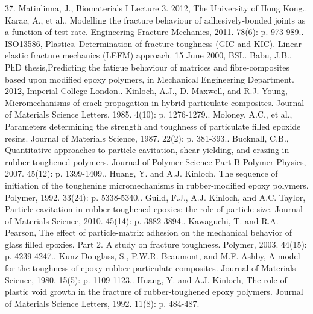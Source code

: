 \documentclass[numbers=noendperiod,chapterprefix=on]{icldt} %
\begin{document}
37.	Matinlinna, J., Biomaterials I Lecture 3. 2012, The University of Hong Kong..	Karac, A., et al., Modelling the fracture behaviour of adhesively-bonded joints as a function of test rate. Engineering Fracture Mechanics, 2011. 78(6): p. 973-989..	ISO13586, Plastics. Determination of fracture toughness (GIC and KIC). Linear elastic fracture mechanics (LEFM) approach. 15 June 2000, BSI..	Babu, J.B., PhD thesis,Predicting the fatigue behaviour of matrices and fibre-composites based upon modified epoxy polymers, in Mechanical Engineering Department. 2012, Imperial College London..	Kinloch, A.J., D. Maxwell, and R.J. Young, Micromechanisms of crack-propagation in hybrid-particulate composites. Journal of Materials Science Letters, 1985. 4(10): p. 1276-1279..	Moloney, A.C., et al., Parameters determining the strength and toughness of particulate filled epoxide resins. Journal of Materials Science, 1987. 22(2): p. 381-393..	Bucknall, C.B., Quantitative approaches to particle cavitation, shear yielding, and crazing in rubber-toughened polymers. Journal of Polymer Science Part B-Polymer Physics, 2007. 45(12): p. 1399-1409..	Huang, Y. and A.J. Kinloch, The sequence of initiation of the toughening micromechanisms in rubber-modified epoxy polymers. Polymer, 1992. 33(24): p. 5338-5340..	Guild, F.J., A.J. Kinloch, and A.C. Taylor, Particle cavitation in rubber toughened epoxies: the role of particle size. Journal of Materials Science, 2010. 45(14): p. 3882-3894..	Kawaguchi, T. and R.A. Pearson, The effect of particle-matrix adhesion on the mechanical behavior of glass filled epoxies. Part 2. A study on fracture toughness. Polymer, 2003. 44(15): p. 4239-4247..	Kunz-Douglass, S., P.W.R. Beaumont, and M.F. Ashby, A model for the toughness of epoxy-rubber particulate composites. Journal of Materials Science, 1980. 15(5): p. 1109-1123..	Huang, Y. and A.J. Kinloch, The role of plastic void growth in the fracture of rubber-toughened epoxy polymers. Journal of Materials Science Letters, 1992. 11(8): p. 484-487.\newline
\end{document}
